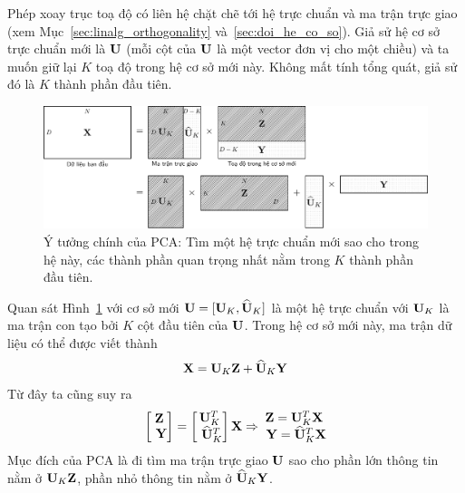 Phép xoay trục toạ độ có liên hệ chặt chẽ tới hệ trực chuẩn và ma trận trực giao
(xem Mục~\ref{sec:linalg_orthogonality} và~\ref{sec:doi_he_co_so}). Giả sử hệ cơ
sở trực chuẩn mới là $\mathbf{U}$ (mỗi cột của $\mathbf{U}$ là một vector đơn vị cho
một chiều) và ta muốn giữ lại $K$ toạ độ trong hệ
cơ sở mới này. Không mất tính tổng quát, giả sử đó là $K$ thành phần đầu tiên.
\begin{figure}[t]
\centering
\includegraphics[width = \textwidth]{Chapters/07_DimemsionalityReduction/27_pca/latex/pca_idea.pdf}
\caption[]{Ý tưởng chính của PCA: Tìm một hệ trực chuẩn mới sao cho trong hệ này, các thành phần quan trọng nhất nằm trong $K$ thành phần đầu tiên.}
\label{fig:27_3}
\end{figure}
Quan sát Hình~\ref{fig:27_3} với cơ sở mới $\mathbf{U} =
[\mathbf{U}_K, \widehat{\mathbf{U}}_K]$ là một hệ trực chuẩn với $\mathbf{U}_K$ là ma trận con tạo bởi $K$ cột đầu tiên của $\mathbf{U}$. Trong hệ cơ sở mới này, ma trận dữ liệu có thể được viết thành
\begin{equation}
\label{eqn:27_8}
\mathbf{X} = \mathbf{U}_K \mathbf{Z} + \widehat{\mathbf{U}}_K \mathbf{Y}
\end{equation}
Từ đây ta cũng suy ra
\begin{eqnarray}
\label{eqn:27_9}
\left[\begin{matrix} \mathbf{Z} \\\ \mathbf{Y} \end{matrix} \right] =
\left[\begin{matrix} \mathbf{U}_K^T \\\ \widehat{\mathbf{U}}_K^T \end{matrix} \right]\mathbf{X} \Rightarrow
\begin{matrix}
\mathbf{Z} = \mathbf{U}_K^T \mathbf{X} \\\
\mathbf{Y} = \widehat{\mathbf{U}}_K^T\mathbf{X}
\end{matrix}
\end{eqnarray}
Mục đích của PCA là đi tìm ma trận trực giao $\mathbf{U}$ sao cho phần lớn thông tin
nằm ở $\mathbf{U}_K \mathbf{Z}$, phần nhỏ thông tin nằm ở $\widehat{\mathbf{U}}_K\mathbf{Y}$.
